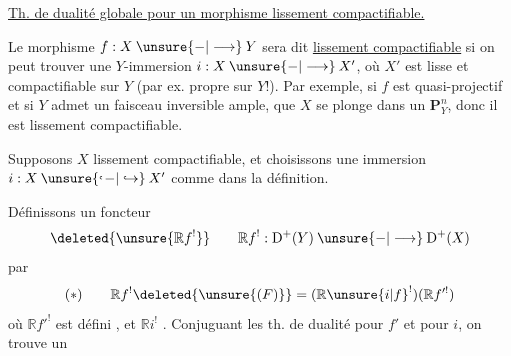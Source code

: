 \uline{Th. de dualité globale pour un morphisme lissement compactifiable.}

Le morphisme $f:X\mathbin{\unsure{-|\longrightarrow}}Y$ sera dit \uline{lissement compactifiable} si on peut trouver une $Y$-immersion $i:X\mathbin{\unsure{-|\longrightarrow}}X'$, où $X'$ est lisse et compactifiable sur $Y$ (par ex. propre sur $Y$!). Par exemple, si $f$ est quasi-projectif et si $Y$ admet un faisceau inversible ample,   que $X$ se plonge dans un $\mathbf P^n_Y$, donc il est lissement compactifiable.

Supposons $X$ lissement compactifiable, et choisissons une immersion $i:X\mathbin{\unsure{\lhook\joinrel-|\hookrightarrow}}X'$ comme dans la définition.


Définissons un foncteur
\[
\deleted{\unsure{\mathbb{R}f^!}}
\qquad \mathbb{R}f^!:\mathrm D^+(Y)\mathbin{\unsure{-|\longrightarrow}}\mathrm D^+(X)
\]
par
\[
(*)\qquad \mathbb{R}f^!\deleted{\unsure{(F)}}=(\mathbb{R}\unsure{i|f}^!)(\mathbb{R}f'^!)
\]
où $\mathbb{R}f'^!$ est défini \unsure{---}, et $\mathbb{R}i^!$  \unsure{---}.
Conjuguant les th. de dualité pour $f'$ et pour $i$, on trouve un
